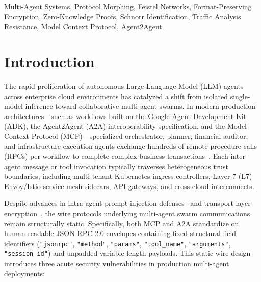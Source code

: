 \documentclass[conference,10pt]{IEEEtran}
\begin{document}
\begin{IEEEkeywords}
Multi-Agent Systems, Protocol Morphing, Feistel Networks, Format-Preserving Encryption, Zero-Knowledge Proofs, Schnorr Identification, Traffic Analysis Resistance, Model Context Protocol, Agent2Agent.
\end{IEEEkeywords}

\section{Introduction}
\label{sec:intro}
The rapid proliferation of autonomous Large Language Model (LLM) agents across enterprise cloud environments has catalyzed a shift from isolated single-model inference toward collaborative multi-agent swarms. In modern production architectures---such as workflows built on the Google Agent Development Kit (ADK), the Agent2Agent (A2A) interoperability specification, and the Model Context Protocol (MCP)---specialized orchestrator, planner, financial auditor, and infrastructure execution agents exchange hundreds of remote procedure calls (RPCs) per workflow to complete complex business transactions~\cite{greshake2023not, debenedetti2024agentdojo, zhan2024injecagent}. Each inter-agent message or tool invocation typically traverses heterogeneous trust boundaries, including multi-tenant Kubernetes ingress controllers, Layer-7 (L7) Envoy/Istio service-mesh sidecars, API gateways, and cross-cloud interconnects.

Despite advances in intra-agent prompt-injection defenses~\cite{debenedetti2025camel} and transport-layer encryption~\cite{rescorla2018tls13}, the wire protocols underlying multi-agent swarm communications remain structurally static. Specifically, both MCP and A2A standardize on human-readable JSON-RPC 2.0 envelopes containing fixed structural field identifiers (\texttt{"jsonrpc"}, \texttt{"method"}, \texttt{"params"}, \texttt{"tool\_name"}, \texttt{"arguments"}, \texttt{"session\_id"}) and unpadded variable-length payloads. This static wire design introduces three acute security vulnerabilities in production multi-agent deployments:
\end{document}
